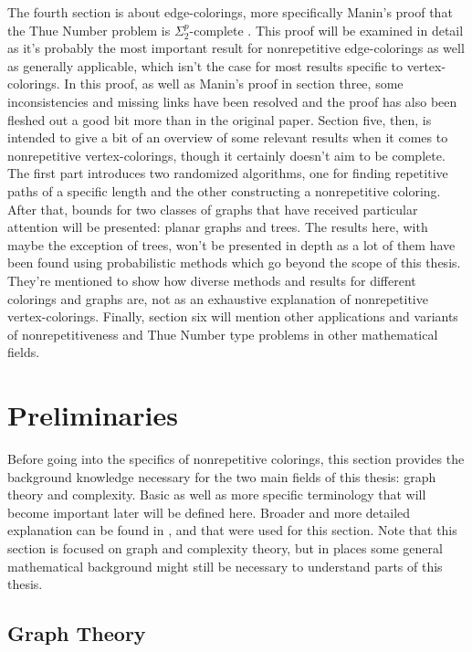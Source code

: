 \documentclass[12pt,a4paper]{article}
\begin{document}
\newline
The fourth section is about edge-colorings, more specifically Manin's proof that the Thue Number problem is $\Sigma^p_2$-complete \citep{Manin2008}. This proof will be examined in detail as it's probably the most important result for nonrepetitive edge-colorings as well as generally applicable, which isn't the case for most results specific to vertex-colorings. In this proof, as well as Manin's proof in section three, some inconsistencies and missing links have been resolved and the proof has also been fleshed out a good bit more than in the original paper.
\newpage
Section five, then, is intended to give a bit of an overview of some relevant results when it comes to nonrepetitive vertex-colorings, though it certainly doesn't aim to be complete. The first part introduces two randomized algorithms, one for finding repetitive paths of a specific length and the other constructing a nonrepetitive coloring. After that, bounds for two classes of graphs that have received particular attention will be presented: planar graphs and trees. The results here, with maybe the exception of trees, won't be presented in depth as a lot of them have been found using probabilistic methods which go beyond the scope of this thesis. They're mentioned to show how diverse methods and results for different colorings and graphs are, not as an exhaustive explanation of nonrepetitive vertex-colorings.
\newline
Finally, section six will mention other applications and variants of nonrepetitiveness and Thue Number type problems in other mathematical fields.
\newpage

\section{Preliminaries}

Before going into the specifics of nonrepetitive colorings, this section provides the background knowledge necessary for the two main fields of this thesis: graph theory and complexity. Basic as well as more specific terminology that will become important later will be defined here. Broader and more detailed explanation can be found in \citep{Bollobas1998}, \citep{Gross2013} and \citep{Davis1983} that were used for this section. Note that this section is focused on graph and complexity theory, but in places some general mathematical background might still be necessary to understand parts of this thesis. 

\subsection{Graph Theory}
\end{document}

